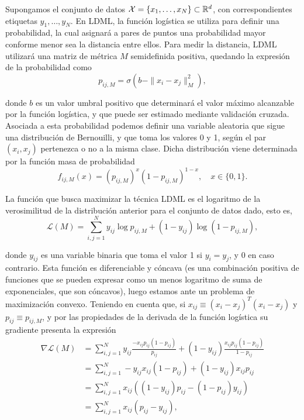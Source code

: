 Supongamos el conjunto de datos $\mathcal{X} = \{x_1,\dots,x_N\} \subset \mathbb{R}^d$, con correspondientes etiquetas $y_1,\dots,y_N$. En LDML, la función logística se utiliza para definir una probabilidad, la cual asignará a pares de puntos una probabilidad mayor conforme menor sea la distancia entre ellos. Para medir la distancia, LDML utilizará una matriz de métrica $M$ semidefinida positiva, quedando la expresión de la probabilidad como
\begin{equation}
    p_{ij,M} = \sigma(b - \|x_i-x_j\|_M^2),
\end{equation} 

donde $b$ es un valor umbral positivo que determinará el valor máximo alcanzable por la función logística, y que puede ser estimado mediante validación cruzada. Asociada a esta probabilidad podemos definir una variable aleatoria que sigue una distribución de Bernouilli, y que toma los valores 0 y 1, según el par $(x_i,x_j)$ pertenezca o no a la misma clase. Dicha distribución viene determinada por la función masa de probabilidad
\[ f_{ij,M}(x) = (p_{ij,M})^{x}(1-p_{ij,M})^{1-x}, \quad x  \in \{0,1\}. \]

La función que busca maximizar la técnica LDML es el logaritmo de la verosimilitud de la distribución anterior para el conjunto de datos dado, esto es,
\begin{equation}
    \mathcal{L}(M) = \sum_{i,j=1}^N y_{ij}\log p_{ij,M} + (1-y_{ij})\log(1-p_{ij,M}),
\end{equation}

donde $y_{ij}$ es una variable binaria que toma el valor 1 si $y_i = y_j$, y 0 en caso contrario. Esta función es diferenciable y cóncava (es una combinación positiva de funciones que se pueden expresar como un menos logaritmo de suma de exponenciales, que son cóncavos), luego estamos ante un problema de maximización convexo. Teniendo en cuenta que, si $x_{ij} \equiv (x_i-x_j)^T(x_i-x_j)$ y $p_{ij} \equiv p_{ij,M}$, y por las propiedades de la derivada de la función logística su gradiente presenta la expresión
\begin{align*}
    \mathcal{\nabla L}(M) &= \sum_{i,j=1}^N y_{ij}\frac{-x_{ij} p_{ij}(1 - p_{ij})}{p_{ij}} + (1-y_{ij})\frac{x_{ij}p_{ij}(1-p_{ij})}{1-p_{ij}} \\
                          &= \sum_{i,j=1}^N -y_{ij}x_{ij}(1 - p_{ij}) + (1-y_{ij})x_{ij}p_{ij} \\
                          &= \sum_{i,j=1}^N x_{ij}((1-y_{ij})p_{ij}-(1-p_{ij})y_{ij}) \\
                          &= \sum_{i,j=1}^N x_{ij}(p_{ij}-y_{ij}),
\end{align*}

